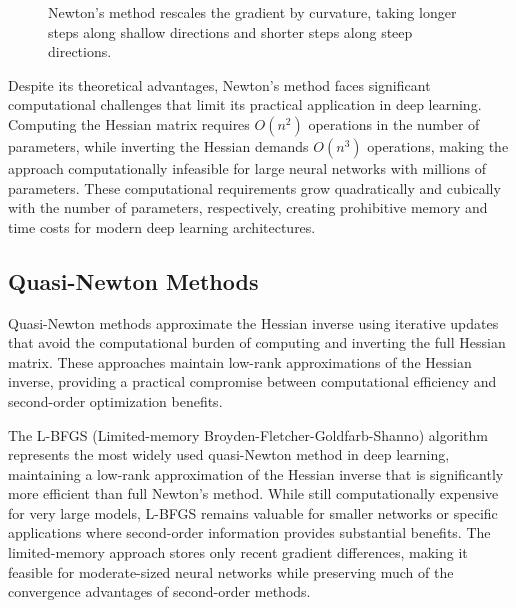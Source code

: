 \begin{figure}[h]
\centering
{}
\caption{Newton's method rescales the gradient by curvature, taking longer steps along shallow directions and shorter steps along steep directions.}
\label{fig:newton-bowl}
\end{figure}

Despite its theoretical advantages, Newton's method faces significant computational challenges that limit its practical application in deep learning. Computing the Hessian matrix requires $O(n^2)$ operations in the number of parameters, while inverting the Hessian demands $O(n^3)$ operations, making the approach computationally infeasible for large neural networks with millions of parameters. These computational requirements grow quadratically and cubically with the number of parameters, respectively, creating prohibitive memory and time costs for modern deep learning architectures.

\subsection{Quasi-Newton Methods}

Quasi-Newton methods approximate the Hessian inverse using iterative updates that avoid the computational burden of computing and inverting the full Hessian matrix. These approaches maintain low-rank approximations of the Hessian inverse, providing a practical compromise between computational efficiency and second-order optimization benefits.

The L-BFGS (Limited-memory Broyden-Fletcher-Goldfarb-Shanno) algorithm represents the most widely used quasi-Newton method in deep learning, maintaining a low-rank approximation of the Hessian inverse that is significantly more efficient than full Newton's method. While still computationally expensive for very large models, L-BFGS remains valuable for smaller networks or specific applications where second-order information provides substantial benefits. The limited-memory approach stores only recent gradient differences, making it feasible for moderate-sized neural networks while preserving much of the convergence advantages of second-order methods.

